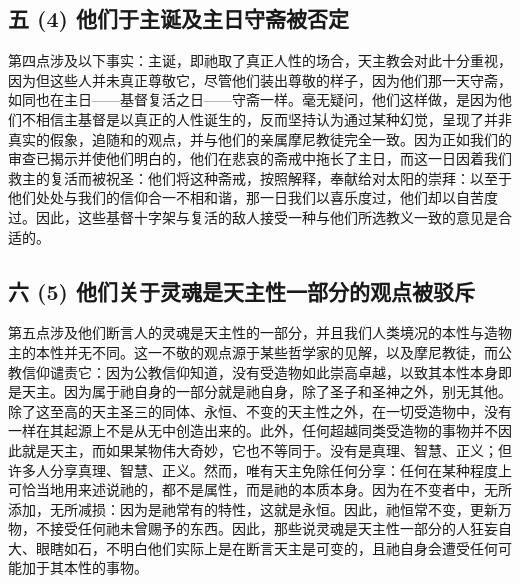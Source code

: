 
\subsection{五 (4) 他们于主诞及主日守斋被否定}

第四点涉及以下事实：主诞，即祂取了真正人性的场合，天主教会对此十分重视，因为但这些人并未真正尊敬它，尽管他们装出尊敬的样子，因为他们那一天守斋，如同也在主日——基督复活之日——守斋一样。毫无疑问，他们这样做，是因为他们不相信主基督是以真正的人性诞生的，反而坚持认为通过某种幻觉，呈现了并非真实的假象，追随和的观点，并与他们的亲属摩尼教徒完全一致。因为正如我们的审查已揭示并使他们明白的，他们在悲哀的斋戒中拖长了主日，而这一日因着我们救主的复活而被祝圣：他们将这种斋戒，按照解释，奉献给对太阳的崇拜：以至于他们处处与我们的信仰合一不相和谐，那一日我们以喜乐度过，他们却以自苦度过。因此，这些基督十字架与复活的敌人接受一种与他们所选教义一致的意见是合适的。\par


\subsection{六 (5) 他们关于灵魂是天主性一部分的观点被驳斥}

第五点涉及他们断言人的灵魂是天主性的一部分，并且我们人类境况的本性与造物主的本性并无不同。这一不敬的观点源于某些哲学家的见解，以及摩尼教徒，而公教信仰谴责它：因为公教信仰知道，没有受造物如此崇高卓越，以致其本性本身即是天主。因为属于祂自身的一部分就是祂自身，除了圣子和圣神之外，别无其他。除了这至高的天主圣三的同体、永恒、不变的天主性之外，在一切受造物中，没有一样在其起源上不是从无中创造出来的。此外，任何超越同类受造物的事物并不因此就是天主，而如果某物伟大奇妙，它也不等同于。没有是真理、智慧、正义；但许多人分享真理、智慧、正义。然而，唯有天主免除任何分享：任何在某种程度上可恰当地用来述说祂的，都不是属性，而是祂的本质本身。因为在不变者中，无所添加，无所减损：因为是祂常有的特性，这就是永恒。因此，祂恒常不变，更新万物，不接受任何祂未曾赐予的东西。因此，那些说灵魂是天主性一部分的人狂妄自大、眼瞎如石，不明白他们实际上是在断言天主是可变的，且祂自身会遭受任何可能加于其本性的事物。\par

